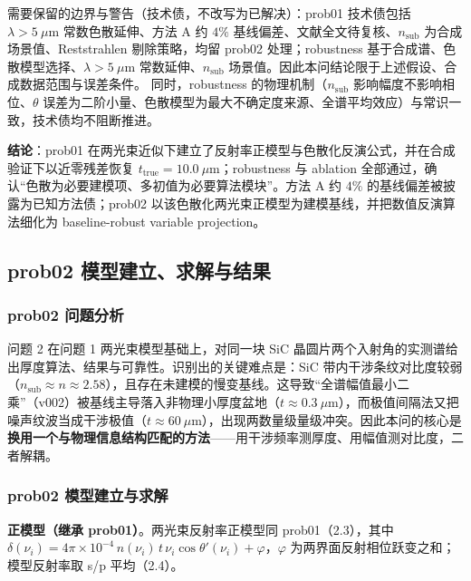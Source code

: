 需要保留的边界与警告（技术债，不改写为已解决）：prob01 技术债包括
\(\lambda>5\ \mu\mathrm{m}\) 常数色散延伸、方法 A 约 \(4\%\)
基线偏差、文献全文待复核、\(n_{\mathrm{sub}}\)
为合成场景值、Reststrahlen 剔除策略，均留 prob02 处理；robustness
基于合成谱、色散模型选择、\(\lambda>5\ \mu\mathrm{m}\)
常数延伸、\(n_{\mathrm{sub}}\)
场景值。因此本问结论限于上述假设、合成数据范围与误差条件。
同时，robustness 的物理机制（\(n_{\mathrm{sub}}\)
影响幅度不影响相位、\(\theta\)
误差为二阶小量、色散模型为最大不确定度来源、全谱平均效应）与常识一致，技术债均不阻断推进。

\textbf{结论}：prob01
在两光束近似下建立了反射率正模型与色散化反演公式，并在合成验证下以近零残差恢复
\(t_{\mathrm{true}}=10.0\ \mu\mathrm{m}\)；robustness 与 ablation
全部通过，确认``色散为必要建模项、多初值为必要算法模块''。方法 A 约
\(4\%\) 的基线偏差被披露为已知方法债；prob02
以该色散化两光束正模型为建模基线，并把数值反演算法细化为 baseline-robust
variable projection。

\subsection{prob02
模型建立、求解与结果}\label{prob02-ux6a21ux578bux5efaux7acbux6c42ux89e3ux4e0eux7ed3ux679c}

\subsubsection{prob02 问题分析}\label{prob02-ux95eeux9898ux5206ux6790}

问题 2 在问题 1 两光束模型基础上，对同一块 SiC
晶圆片两个入射角的实测谱给出厚度算法、结果与可靠性。识别出的关键难点是：SiC
带内干涉条纹对比度较弱（\(n_{\mathrm{sub}}\approx n\approx2.58\)），且存在未建模的慢变基线。这导致``全谱幅值最小二乘''（v002）被基线主导落入非物理小厚度盆地（\(t\approx0.3\ \mu\mathrm{m}\)），而极值间隔法又把噪声纹波当成干涉极值（\(t\approx60\ \mu\mathrm{m}\)），出现两数量级量级冲突。因此本问的核心是\textbf{换用一个与物理信息结构匹配的方法}------用干涉频率测厚度、用幅值测对比度，二者解耦。

\subsubsection{prob02
模型建立与求解}\label{prob02-ux6a21ux578bux5efaux7acbux4e0eux6c42ux89e3}

\textbf{正模型（继承 prob01）}。两光束反射率正模型同 prob01（2.3），其中
\(\delta(\nu_i)=4\pi\times10^{-4}\,n(\nu_i)\,t\,\nu_i\cos\theta'(\nu_i)+\varphi\)，\(\varphi\)
为两界面反射相位跃变之和；模型反射率取 s/p 平均（2.4）。

